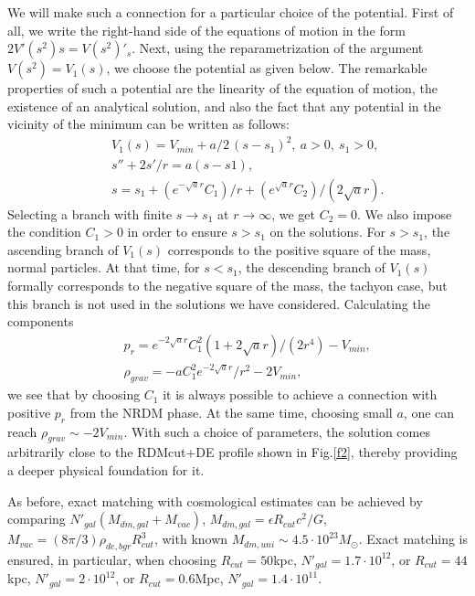 \documentclass{article}
\begin{document}
We will make such a connection for a particular choice of the potential. First of all, we write the right-hand side of the equations of motion in the form $ 2V '(s ^ 2) s = V (s ^ 2)' _ s $. Next, using the reparametrization of the argument $ V (s ^ 2) = V_1 (s) $, we choose the potential as given below. The remarkable properties of such a potential are the linearity of the equation of motion, the existence of an analytical solution, and also the fact that any potential in the vicinity of the minimum can be written as follows: 
\begin{eqnarray}
&&V_1(s)=V_{min}+a/2\,(s-s_1)^2,\ a>0,\ s_1>0,\label{V1q}\\
&&s''+2s'/r = a(s-s1),\\
&&s=s_1 + (e^{-\sqrt{a} r} C_1)/r + (e^{\sqrt{a} r} C_2)/(2 \sqrt{a} r)\label{V1sol}.
\end{eqnarray}
Selecting a branch with finite $ s \to s_1 $ at $ r \to \infty $, we get $ C_2 = 0 $. We also impose the condition $ C_1> 0 $ in order to ensure $ s> s_1 $ on the solutions. For $ s> s_1 $, the ascending branch of $ V_1 (s) $ corresponds to the positive square of the mass, normal particles. At that time, for $ s <s_1 $, the descending branch of $ V_1 (s) $ formally corresponds to the negative square of the mass, the tachyon case, but this branch is not used in the solutions we have considered. Calculating the components
\begin{eqnarray}
&&p_r=e^{-2 \sqrt{a} r} C_1^2 (1 + 2 \sqrt{a} r)/(2r^4) -V_{min},\\
&&\rho_{grav}=-a C_1^2 e^{-2 \sqrt{a} r}/r^2- 2V_{min},
\end{eqnarray}
we see that by choosing $ C_1 $ it is always possible to achieve a connection with positive $ p_r $ from the NRDM phase. At the same time, choosing small $ a $, one can reach $ \rho_ {grav} \sim -2V_ {min} $. With such a choice of parameters, the solution comes arbitrarily close to the RDMcut+DE profile shown in Fig.\ref {f2}, thereby providing a deeper physical foundation for it.

As before, exact matching with cosmological estimates can be achieved by comparing $ N '_ {gal} (M_ {dm, gal} + M_ {vac}) $, $ M_ {dm, gal} = \epsilon R_ {cut} c ^ 2 / G $, $ M_ {vac} = (8 \pi / 3) \rho_ {de, bgr} R_ {cut} ^ 3 $, with known $ M_ {dm, uni} \sim4.5 \cdot10 ^ {23} M_ \odot $. Exact matching is ensured, in particular, when choosing $ R_ {cut} = 50 $kpc, $ N '_ {gal} = 1.7 \cdot10 ^ {12} $, or $ R_ {cut} = 44 $kpc, $ N' _ {gal} = 2 \cdot10 ^ {12} $, or $ R_ {cut} = 0.6 $Mpc, $ N '_ {gal} = 1.4 \cdot10 ^ {11} $. 
\end{document}
